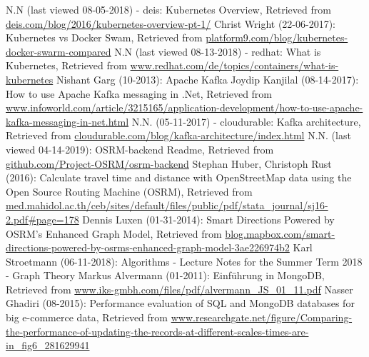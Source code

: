 \begin{thebibliography}{..........}
   	N.N (last viewed 08-05-2018) - deis:
                              	Kubernetes Overview,
                              	Retrieved from \url{deis.com/blog/2016/kubernetes-overview-pt-1/}
   	Christ Wright (22-06-2017):
                              	Kubernetes vs Docker Swam,
                              	Retrieved from \url{platform9.com/blog/kubernetes-docker-swarm-compared}
   	N.N (last viewed 08-13-2018) - redhat:
   				What is Kubernetes,
   				Retrieved from \url{www.redhat.com/de/topics/containers/what-is-kubernetes}
   	Nishant Garg (10-2013):
   				Apache Kafka
   	Joydip Kanjilal (08-14-2017):
                              	How to use Apache Kafka messaging in .Net, 
                              	Retrieved from \url{www.infoworld.com/article/3215165/application-development/how-to-use-apache-kafka-messaging-in-net.html}
   	N.N. (05-11-2017) - cloudurable:
                              	Kafka architecture,
                              	Retrieved from \url{cloudurable.com/blog/kafka-architecture/index.html}
   	N.N. (last viewed 04-14-2019):
                              	OSRM-backend Readme,
                              	Retrieved from \url{github.com/Project-OSRM/osrm-backend}
   	Stephan Huber, Christoph Rust (2016):
                              	Calculate travel time and distance with OpenStreetMap data using the Open Source Routing Machine (OSRM),
                              	Retrieved from \url{med.mahidol.ac.th/ceb/sites/default/files/public/pdf/stata_journal/sj16-2.pdf#page=178}
   	Dennis Luxen (01-31-2014):
                              	Smart Directions Powered by OSRM’s Enhanced Graph Model,
                              	Retrieved from \url{blog.mapbox.com/smart-directions-powered-by-osrms-enhanced-graph-model-3ae226974b2}
   	Karl Stroetmann (06-11-2018):
                              	Algorithms - Lecture Notes for the Summer Term 2018 - Graph Theory
   	Markus Alvermann (01-2011):
                             	Einführung in MongoDB, 
                              	Retrieved from \url{www.iks-gmbh.com/files/pdf/alvermann_JS_01_11.pdf}
   	Nasser Ghadiri (08-2015):
                              	Performance evaluation of SQL and MongoDB databases for big e-commerce data, 
                              	Retrieved from \url{www.researchgate.net/figure/Comparing-the-performance-of-updating-the-records-at-different-scales-times-are-in_fig6_281629941}

\end{thebibliography}
